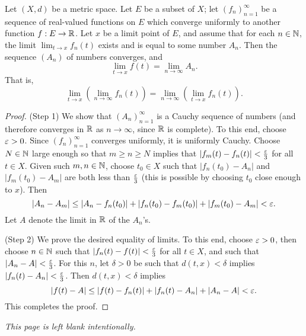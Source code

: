 \documentclass[12pt]{scrartcl} %
\begin{document}
\begin{theorem}
    Let $(X, d)$ be a metric space. Let $E$ be a subset of $X$; let $(f_n)_{n=1}^{\infty}$ be a sequence of real-valued functions on $E$ which converge uniformly to another function $f : E \to \mathbb{R}$. Let $x$ be a limit point of $E$, and assume that for each $n \in \mathbb{N}$, the limit $\lim_{t \to x}f_n(t)$ exists and is equal to some number $A_n$. Then the sequence $(A_n)$ of numbers converges, and \[\lim_{t \to x}f(t) = \lim_{n \to \infty} A_n.\] That is, \[\lim_{t \to x} \left(\lim_{n \to \infty} f_n(t) \right) = \lim_{n \to \infty} \left(\lim_{t \to x} f_n(t)\right).\]
\end{theorem}

\begin{proof}
    (Step 1) We show that $(A_n)_{n=1}^{\infty}$ is a Cauchy sequence of numbers (and therefore converges in $\mathbb{R}$ as $n \to \infty$, since $\mathbb{R}$ is complete). To this end, choose $\varepsilon > 0$. Since $(f_n)_{n=1}^{\infty}$ converges uniformly, it is uniformly Cauchy. Choose $N \in \mathbb{N}$ large enough so that $m \geq n \geq N$ implies that $|f_m(t) - f_n(t)| < \frac{\varepsilon}{3}$ for all $t \in X$. Given such $m, n \in \mathbb{N}$, choose $t_0 \in X$ such that $|f_n(t_0) - A_n|$ and $|f_m(t_0) - A_m|$ are both less than $\frac{\varepsilon}{3}$ (this is possible by choosing $t_0$ close enough to $x$). Then \[|A_n - A_m| \leq |A_n - f_n(t_0)| + |f_n(t_0) - f_m(t_0)| + |f_m(t_0) - A_m| < \varepsilon.\] Let $A$ denote the limit in $\mathbb{R}$ of the $A_n$'s.

    (Step 2) We prove the desired equality of limits. To this end, choose $\varepsilon > 0$, then choose $n \in \mathbb{N}$ such that $|f_n(t) - f(t)| < \frac{\varepsilon}{3}$ for all $t \in X$, and such that $|A_n - A| < \frac{\varepsilon}{3}$. For this $n$, let $\delta > 0$ be such that $d(t, x) < \delta$ implies $|f_n(t) - A_n| < \frac{\varepsilon}{3}$. Then $d(t, x) < \delta$ implies \[|f(t) - A| \leq |f(t) - f_n(t)| + |f_n(t) - A_n| + |A_n - A| < \varepsilon.\] This completes the proof.
\end{proof}


\pagebreak

\textit{This page is left blank intentionally.}
\end{document}
